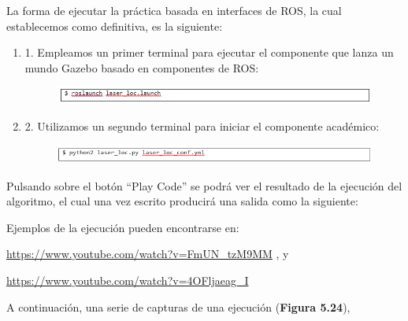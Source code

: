 La forma de ejecutar la práctica basada en interfaces de ROS, la cual establecemos como definitiva, es la siguiente:

\begin{enumerate}
	\item 1.	Empleamos un primer terminal para ejecutar el componente que lanza un mundo Gazebo basado en componentes de ROS:
	\begin{figure}[H]
		\begin{center}
			\includegraphics[width=0.95\linewidth]{figures/llcomando1.png}
			\label{fig.llcomando1}
		\end{center}
	\end{figure}
	\item 2.	Utilizamos un segundo terminal para iniciar el componente académico:
	\begin{figure}[H]
		\begin{center}
			\includegraphics[width=0.95\linewidth]{figures/llcomando2.png}
			\label{fig.llcomando2}
		\end{center}
	\end{figure}
\end{enumerate}

Pulsando sobre el botón “Play Code” se podrá ver el resultado de la ejecución del algoritmo, el cual una vez escrito producirá una salida como la siguiente:

Ejemplos de la ejecución pueden encontrarse en:
 
\url{https://www.youtube.com/watch?v=FmUN_tzM9MM} , y

\url{https://www.youtube.com/watch?v=4OFljaeag_I}

A continuación, una serie de capturas de una ejecución (\textbf{Figura 5.24}),

